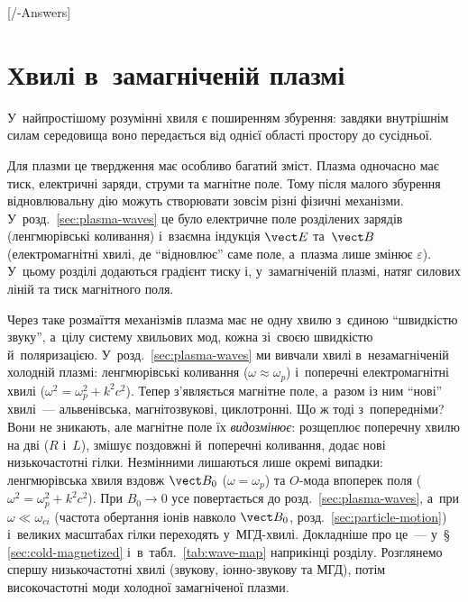 

\graphicspath{{\currfilebase/Pictures}}



[\currfilebase/\currfilebase-Answers]
\chapter{Хвилі в~замагніченій плазмі}
\label{sec:mhd-waves}\hypertarget{mhd-waves}{}

У~найпростішому розумінні хвиля є поширенням збурення: завдяки внутрішнім силам
середовища воно передається від однієї області простору до сусідньої.

Для плазми це твердження має особливо багатий зміст. Плазма одночасно має тиск, електричні
заряди, струми та магнітне поле. Тому після малого збурення відновлювальну дію можуть
створювати зовсім різні фізичні механізми. У~розд.~\ref{sec:plasma-waves} це було електричне поле
розділених зарядів (ленгмюрівські коливання) і~взаємна індукція $\vect E$ та~$\vect B$ (електромагнітні хвилі,
де \enquote{відновлює} саме поле, а~плазма лише змінює $\varepsilon$). У~цьому розділі додаються градієнт тиску
і, у~замагніченій плазмі, натяг силових ліній та тиск магнітного поля.

Через таке розмаїття механізмів плазма має не одну хвилю з~єдиною \enquote{швидкістю звуку}, а~цілу систему
хвильових мод, кожна зі~своєю швидкістю й~поляризацією.
У~розд.~\ref{sec:plasma-waves} ми вивчали хвилі в~незамагніченій холодній плазмі: ленгмюрівські
коливання ($\omega\approx\omega_p$) і~поперечні електромагнітні хвилі ($\omega^2=\omega_p^2+k^2c^2$).
Тепер з'являється магнітне поле, а~разом із ним \enquote{нові} хвилі~--- альвенівська, магнітозвукові, циклотронні.
Що ж тоді з~попередніми? Вони не зникають, але магнітне поле їх \emph{видозмінює}: розщеплює поперечну хвилю на дві
($R$ і~$L$), змішує поздовжні й~поперечні коливання, додає нові низькочастотні гілки. Незмінними лишаються лише окремі
випадки: ленгмюрівська хвиля вздовж $\vect B_0$ ($\omega=\omega_p$) та $O$-мода впоперек поля
($\omega^2=\omega_p^2+k^2c^2$). При $B_0\to0$ усе повертається до розд.~\ref{sec:plasma-waves}, а~при
$\omega\ll\omega_{ci}$ (частота обертання іонів навколо $\vect B_0$, розд.~\ref{sec:particle-motion}) і~великих масштабах гілки переходять у~МГД-хвилі. Докладніше про це~--- у~§\,\ref{sec:cold-magnetized}
і~в~табл.~\ref{tab:wave-map} наприкінці розділу. Розглянемо спершу низькочастотні хвилі (звукову, іонно-звукову та МГД), потім
високочастотні моди холодної замагніченої плазми.



